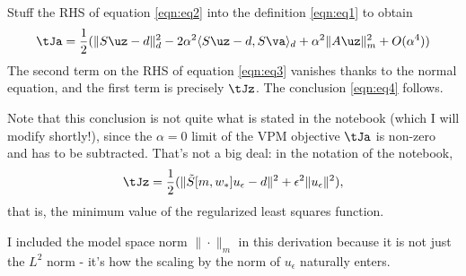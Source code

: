 Stuff the RHS of equation \ref{eqn:eq2} into the definition \ref{eqn:eq1} to obtain
\begin{equation}
  \label{eqn:eq3}
  \tJa = \frac{1}{2}(\|S\uz-d\|_d^2 - 2 \alpha^2\langle S\uz-d, S\va\rangle_d + \alpha^2\|A\uz\|_m^2 + O(\alpha^4))
\end{equation}
The second term on the RHS of equation \ref{eqn:eq3} vanishes thanks to the normal equation, and the first term is precisely $\tJz$. The conclusion \ref{eqn:eq4} follows.

Note that this conclusion is not quite what is stated in the notebook (which I will modify shortly!), since the $\alpha=0$ limit of the VPM objective $\tJa$ is non-zero and has to be subtracted. That's not a big deal: in the notation of the notebook,
\[
  \tJz = \frac{1}{2}(\|\tilde{S}[m,w_*]u_{\epsilon} -d\|^2 + \epsilon^2 \|u_{\epsilon}\|^2),
\]
that is, the minimum value of the regularized least squares function.

I included the model space norm $\|\cdot\|_m$ in this derivation because it is not just the $L^2$ norm - it's how the scaling by the norm of $u_{\epsilon}$ naturally enters.
%
%

